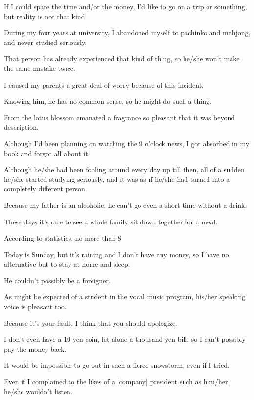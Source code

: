 \item[85.] If I could spare the time and/or the money, I'd like to go on a trip or something, but reality is not that kind.
\item[86.] During my four years at university, I abandoned myself to pachinko and mahjong, and never studied seriously.
\item[87.] That person has already experienced that kind of thing, so he/she won't make the same mistake twice.
\item[88.] I caused my parents a great deal of worry because of this incident.
\item[89.] Knowing him, he has no common sense, so he might do such a thing.
\item[90.] From the lotus blossom emanated a fragrance so pleasant that it was beyond description.
\item[91.] Although I'd been planning on watching the 9 o'clock news, I got absorbed in my book and forgot all about it.
\item[92.] Although he/she had been fooling around every day up till then, all of a sudden he/she started studying seriously, and it was as if he/she had turned into a completely different person.
\item[93.] Because my father is an alcoholic, he can't go even a short time without a drink.
\item[94.] These days it's rare to see a whole family sit down together for a meal.
\item[95.] According to statistics, no more than 8%
\item[96.] Today is Sunday, but it's raining and I don't have any money, so I have no alternative but to stay at home and sleep.
\item[97.] He couldn't possibly be a foreigner.
\item[98.] As might be expected of a student in the vocal music program, his/her speaking voice is pleasant too.
\item[99.] Because it's your fault, I think that you should apologize.
\item[100.] I don't even have a 10-yen coin, let alone a thousand-yen bill, so I can't possibly pay the money back.
\item[101.] It would be impossible to go out in such a fierce snowstorm, even if I tried.
\item[102.] Even if I complained to the likes of a [company] president such as him/her, he/she wouldn't listen.
